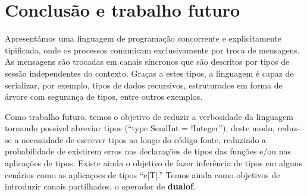 \section{Conclusão e trabalho futuro}
Apresentámos uma linguagem de programação concorrente e explicitamente tipificada, onde os processos comunicam exclusivamente por troca de mensagens. As mensagens são trocadas em canais síncronos que são descritos por tipos de sessão independentes do contexto. Graças a estes tipos, a linguagem é capaz de serializar, por exemplo, tipos de dados recursivos, estruturados em forma de árvore com segurança de tipos, entre outros exemplos.

Como trabalho futuro, temos o objetivo de reduzir a verbosidade da linguagem tornando possível abreviar tipos (``type SendInt = !Integer''), deste modo, reduz-se a necessidade de escrever tipos ao longo do código fonte, reduzindo a probabilidade de existirem erros nas declarações de tipos das funções e/ou nas aplicações de tipos. Existe ainda o objetivo de fazer inferência de tipos em alguns cenários como as aplicaçoes de tipos ``e[T].''
 Temos ainda como objetivos de introduzir canais partilhados, o operador de \textbf{dualof}.
 
